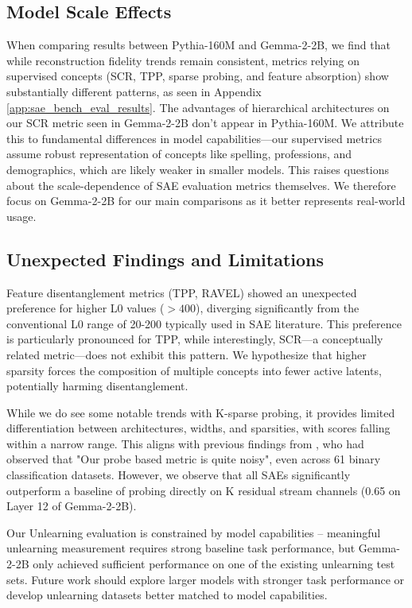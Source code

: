 \documentclass{article}
\theoremstyle{plain}
\theoremstyle{definition}
\theoremstyle{remark}
\begin{document}
\subsection{Model Scale Effects}

When comparing results between Pythia-160M and Gemma-2-2B, we find that while reconstruction fidelity trends remain consistent, metrics relying on supervised concepts (SCR, TPP, sparse probing, and feature absorption) show substantially different patterns, as seen in Appendix \ref{app:sae_bench_eval_results}. The advantages of hierarchical architectures on our SCR metric seen in Gemma-2-2B don't appear in Pythia-160M. We attribute this to fundamental differences in model capabilities—our supervised metrics assume robust representation of concepts like spelling, professions, and demographics, which are likely weaker in smaller models. This raises questions about the scale-dependence of SAE evaluation metrics themselves. We therefore focus on Gemma-2-2B for our main comparisons as it better represents real-world usage.

\subsection{Unexpected Findings and Limitations}

Feature disentanglement metrics (TPP, RAVEL) showed an unexpected preference for higher L0 values ($> 400$), diverging significantly from the conventional L0 range of 20-200 typically used in SAE literature. This preference is particularly pronounced for TPP, while interestingly, SCR—a conceptually related metric—does not exhibit this pattern. We hypothesize that higher sparsity forces the composition of multiple concepts into fewer active latents, potentially harming disentanglement.

While we do see some notable trends with K-sparse probing, it provides limited differentiation between architectures, widths, and sparsities, with scores falling within a narrow range. This aligns with previous findings from \citet{gao2024scaling}, who had observed that "Our probe based metric is quite noisy", even across 61 binary classification datasets. However, we observe that all SAEs significantly outperform a baseline of probing directly on K residual stream channels (0.65 on Layer 12 of Gemma-2-2B).

Our Unlearning evaluation is constrained by model capabilities -- meaningful unlearning measurement requires strong baseline task performance, but Gemma-2-2B only achieved sufficient performance on one of the existing unlearning test sets. Future work should explore larger models with stronger task performance or develop unlearning datasets better matched to model capabilities.
\end{document}
